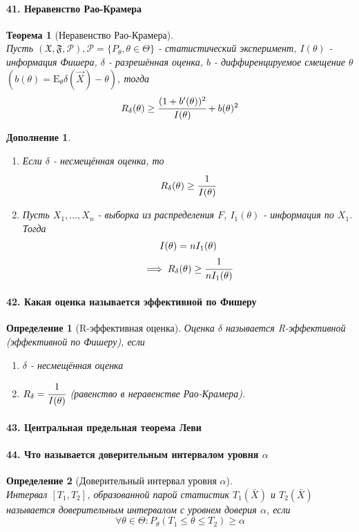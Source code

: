 \documentclass[titlepage]{article}
\newcommand{\sP}{\mathcal{P}}
\newcommand{\sF}{\mathfrak{F}}
\newcommand{\sX}{\mathfrak{X}}
\newcommand{\sE}{\mathrm{E}}
\newtheorem{theorem}{Теорема}
\newtheorem{definition}{Определение}
\newtheorem*{addition}{Дополнение}
\begin{document}
\paragraph{41. Неравенство Рао-Крамера}
\begin{theorem}[Неравенство Рао-Крамера] ~\\
	Пусть $(\sX,\sF,\sP), \sP = \{P_\theta, \theta \in \Theta\}$ - статистический эксперимент, $I(\theta)$ - информация Фишера, $\delta$ - разрешённая оценка, $b$ - диффиренцируемое смещение $\theta$	$(b(\theta) = \sE_\theta\delta(\vec X)-\theta)$, тогда
	\[R_\delta(\theta)\geq\cfrac{(1+b'(\theta))^2}{I(\theta)}+b(\theta)^2\]
\end{theorem}
\begin{addition} ~\\
	\begin{enumerate}
		\item Если $\delta$ - несмещённая оценка, то
		\[R_\delta(\theta)\geq\cfrac{1}{I(\theta)}\]
		\item Пусть $X_1,\dots,X_n$ - выборка из распределения $F$, $I_1(\theta)$ - информация по $X_1$. Тогда
		\begin{gather*}
			I(\theta) = nI_1(\theta)\\
			\implies R_\delta(\theta)\geq\cfrac{1}{nI_1(\theta)}
		\end{gather*}
	\end{enumerate}
\end{addition}

\paragraph{42. Какая оценка называется эффективной по Фишеру}
\begin{definition}[R-эффективная оценка]
	Оценка $\delta$ называется R-эффективной (эффективной по Фишеру), если
	\begin{enumerate}
		\item $\delta$ - несмещённая оценка
		\item $R_\delta = \cfrac{1}{I(\theta)}$ (равенство в неравенстве Рао-Крамера).
	\end{enumerate}
\end{definition}

\paragraph{43. Центральная предельная теорема Леви}

\paragraph{44. Что называется доверительным интервалом уровня $\alpha$}
\begin{definition}[Доверительный интервал уровня $\alpha$] ~\\
	Интервал $[T_1,T_2]$, образованной парой статистик $T_1(\bar X)$ и $T_2(\bar X)$ называется доверительным интервалом с уровнем доверия $\alpha$, если
	\[\forall \theta \in \Theta: P_\theta(T_1 \leq \theta \leq T_2) \geq \alpha\]
\end{definition}
\end{document}
